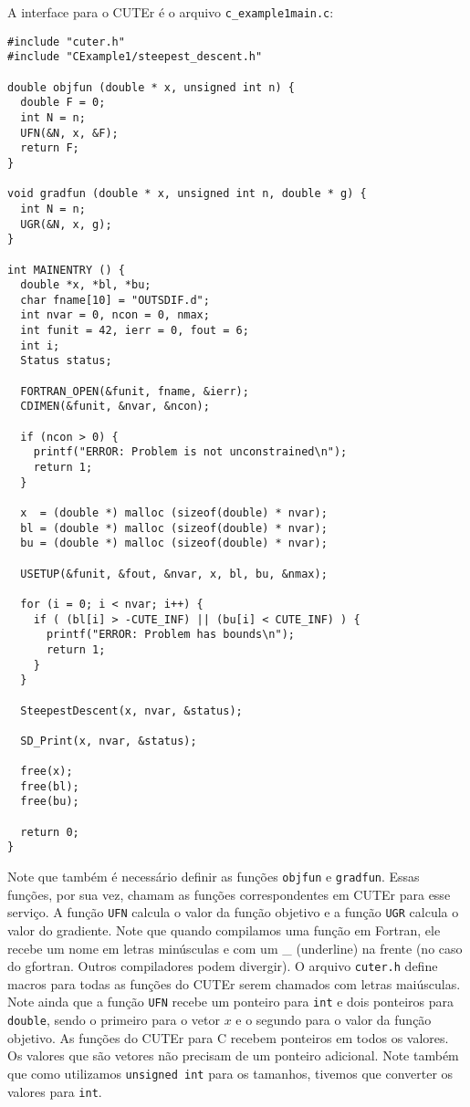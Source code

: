 \documentclass[letterpaper,11pt]{article}
\numberwithin{equation}{section}
\begin{document}
A interface para o CUTEr é o arquivo \verb+c_example1main.c+:
\begin{verbatim}
#include "cuter.h"
#include "CExample1/steepest_descent.h"

double objfun (double * x, unsigned int n) {
  double F = 0;
  int N = n;
  UFN(&N, x, &F);
  return F;
}

void gradfun (double * x, unsigned int n, double * g) {
  int N = n;
  UGR(&N, x, g);
}

int MAINENTRY () {
  double *x, *bl, *bu;
  char fname[10] = "OUTSDIF.d";
  int nvar = 0, ncon = 0, nmax;
  int funit = 42, ierr = 0, fout = 6;
  int i;
  Status status;

  FORTRAN_OPEN(&funit, fname, &ierr);
  CDIMEN(&funit, &nvar, &ncon);

  if (ncon > 0) {
    printf("ERROR: Problem is not unconstrained\n");
    return 1;
  }

  x  = (double *) malloc (sizeof(double) * nvar);
  bl = (double *) malloc (sizeof(double) * nvar);
  bu = (double *) malloc (sizeof(double) * nvar);

  USETUP(&funit, &fout, &nvar, x, bl, bu, &nmax);

  for (i = 0; i < nvar; i++) {
    if ( (bl[i] > -CUTE_INF) || (bu[i] < CUTE_INF) ) {
      printf("ERROR: Problem has bounds\n");
      return 1;
    }
  }

  SteepestDescent(x, nvar, &status);

  SD_Print(x, nvar, &status);

  free(x);
  free(bl);
  free(bu);

  return 0;
}
\end{verbatim}
Note que também é necessário definir as funções \verb+objfun+ e \verb+gradfun+. Essas
funções, por sua vez, chamam as funções correspondentes em CUTEr para esse serviço.
A função \verb+UFN+ calcula o valor da função objetivo e a função \verb+UGR+ calcula
o valor do gradiente. Note que quando compilamos uma função em Fortran, ele recebe um
nome em letras minúsculas e com um \_ (underline) na frente (no caso do gfortran. Outros
compiladores podem divergir). O arquivo \verb+cuter.h+ define macros para todas as funções
do CUTEr serem chamados com letras maiúsculas. Note ainda que a função \verb+UFN+ recebe
um ponteiro para \verb+int+ e dois ponteiros para \verb+double+, sendo o primeiro para o
vetor $x$ e o segundo para o valor da função objetivo. As funções do CUTEr para C recebem
ponteiros em todos os valores. Os valores que são vetores não precisam de um ponteiro 
adicional. Note também que como utilizamos \verb+unsigned int+ para os tamanhos, tivemos
que converter os valores para \verb+int+.
\end{document}
